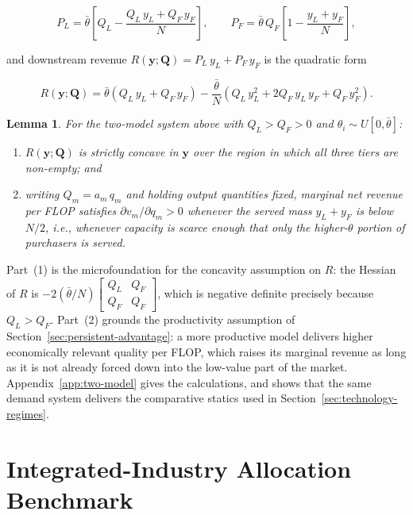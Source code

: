 \documentclass[11pt]{article}
\newtheorem{lemma}{Lemma}
\begin{document}
\begin{equation}P_L=\bar\theta\left[Q_L-\frac{Q_L\,y_L+Q_F\,y_F}{N}\right],\qquad P_F=\bar\theta\,Q_F\left[1-\frac{y_L+y_F}{N}\right],\end{equation}

and downstream revenue $R(\mathbf y;\mathbf Q)=P_L\,y_L+P_F\,y_F$ is the quadratic form

\begin{equation}R(\mathbf y;\mathbf Q)=\bar\theta\left(Q_L\,y_L+Q_F\,y_F\right)-\frac{\bar\theta}{N}\left(Q_L\,y_L^{2}+2Q_F\,y_L\,y_F+Q_F\,y_F^{2}\right).\end{equation}

\begin{lemma}\label{lem:two-model}
For the two-model system above with $Q_L>Q_F>0$ and $\theta_i\sim U[0,\bar\theta]$:
\begin{enumerate}
\item $R(\mathbf y;\mathbf Q)$ is strictly concave in $\mathbf y$ over the region in which all three tiers are non-empty; and
\item writing $Q_m=a_m\,q_m$ and holding output quantities fixed, marginal net revenue per FLOP satisfies $\partial v_m/\partial q_m>0$ whenever the served mass $y_L+y_F$ is below $N/2$, i.e., whenever capacity is scarce enough that only the higher-$\theta$ portion of purchasers is served.
\end{enumerate}
\end{lemma}

Part~(1) is the microfoundation for the concavity assumption on $R$: the Hessian of $R$ is $-2(\bar\theta/N)\left[\begin{smallmatrix}Q_L&Q_F\\ Q_F&Q_F\end{smallmatrix}\right]$, which is negative definite precisely because $Q_L>Q_F$. Part~(2) grounds the productivity assumption of Section~\ref{sec:persistent-advantage}: a more productive model delivers higher economically relevant quality per FLOP, which raises its marginal revenue as long as it is not already forced down into the low-value part of the market. Appendix~\ref{app:two-model} gives the calculations, and shows that the same demand system delivers the comparative statics used in Section~\ref{sec:technology-regimes}.

\section{Integrated-Industry Allocation Benchmark}
\label{sec:allocation}
\end{document}
